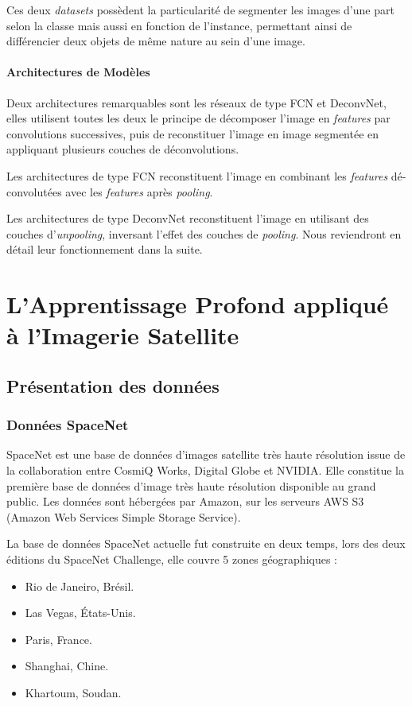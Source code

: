 \documentclass[a4paper, 10pt]{report}
\begin{document}
Ces deux \emph{datasets} possèdent la particularité de segmenter les images d'une part selon la classe mais aussi en fonction de l'instance, permettant ainsi de différencier deux objets de même nature au sein d'une image.
\subsubsection{Architectures de Modèles}
Deux architectures remarquables sont les réseaux de type FCN et DeconvNet, elles utilisent toutes les deux le principe de décomposer l'image en \emph{features} par convolutions successives, puis de reconstituer l'image en image segmentée en appliquant plusieurs couches de déconvolutions.

Les architectures de type FCN reconstituent l'image en combinant les \emph{features} dé-convolutées avec les \emph{features} après \emph{pooling}.

Les architectures de type DeconvNet reconstituent l'image en utilisant des couches d'\emph{unpooling}, inversant l'effet des couches de \emph{pooling}. Nous reviendront en détail leur fonctionnement dans la suite.
\chapter{L'Apprentissage Profond appliqué à l'Imagerie Satellite}
\section{Présentation des données}
\subsection{Données SpaceNet}
SpaceNet est une base de données d'images satellite très haute résolution issue de la collaboration entre CosmiQ Works, Digital Globe et NVIDIA.
Elle constitue la première base de données d'image très haute résolution disponible au grand public.
Les données sont hébergées par Amazon, sur les serveurs AWS S3 (Amazon Web Services Simple Storage Service).

La base de données SpaceNet actuelle fut construite en deux temps, lors des deux éditions du SpaceNet Challenge, elle couvre 5 zones géographiques :
\begin{itemize}
	\item Rio de Janeiro, Brésil.
	\item Las Vegas, États-Unis.
	\item Paris, France.
	\item Shanghai, Chine.
	\item Khartoum, Soudan.
\end{itemize}
\end{document}
